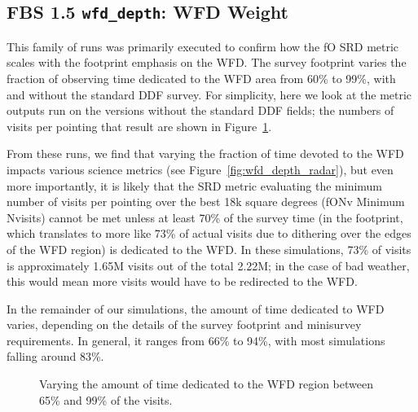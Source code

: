 
\subsection{FBS 1.5 {\tt wfd\_depth}: WFD Weight}\label{ss:wfd_depth}

This family of runs was primarily executed to confirm how the fO SRD metric scales with the footprint emphasis on the WFD. The survey footprint varies the fraction of observing time dedicated to the WFD area from 60\% to 99\%, with and without the standard DDF survey. For simplicity, here we look at the metric outputs run on the versions without the standard DDF fields; the numbers of visits per pointing that result are shown in Figure~\ref{fig:wfd_scale_nvisits}. 

From these runs, we find that varying the fraction of time devoted to the WFD impacts various science metrics (see Figure~\ref{fig:wfd_depth_radar}), but even more importantly, it is likely that the SRD metric evaluating the minimum number of visits per pointing over the best 18k square degrees (fONv Minimum Nvisits) cannot be met unless at least 70\% of the survey time (in the footprint, which translates to more like 73\% of actual visits due to dithering over the edges of the WFD region) is dedicated to the WFD. In these simulations, 73\% of visits is approximately 1.65M visits out of the total 2.22M; in the case of bad weather, this would mean more visits would have to be redirected to the WFD. 

In the remainder of our simulations, the amount of time dedicated to WFD varies, depending on the details of the survey footprint and minisurvey requirements. In general, it ranges from 66\% to 94\%, with most simulations falling around 83\%. 

\begin{figure}
\caption{Varying the amount of time dedicated to the WFD region between 65\% and 99\% of the visits.}
\label{fig:wfd_scale_nvisits}
\end{figure}


